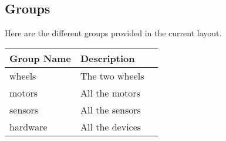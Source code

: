 \subsection{Groups}
Here are the different groups provided in the current layout.

\begin{center}
  \begin{tabular}{|l|l|l|}
    \hline
    Group Name & Description     \\
    \hline
    wheels     & The two wheels  \\
    motors     & All the motors  \\
    sensors    & All the sensors \\
    hardware   & All the devices \\
    \hline
  \end{tabular}
\end{center}

